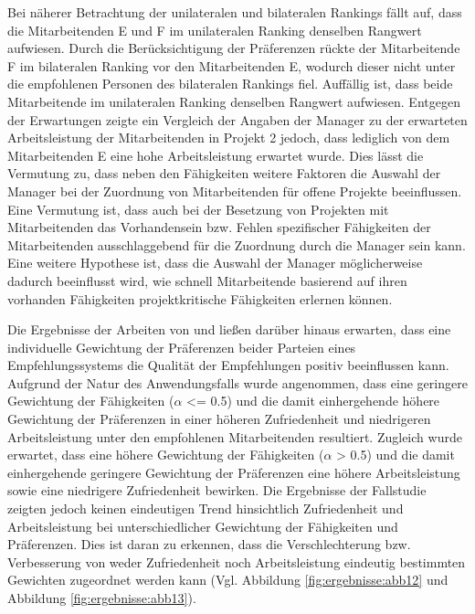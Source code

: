 Bei näherer Betrachtung der unilateralen und bilateralen Rankings fällt auf, dass die Mitarbeitenden E und F im unilateralen Ranking denselben Rangwert aufwiesen.
Durch die Berücksichtigung der Präferenzen rückte der Mitarbeitende F im bilateralen Ranking vor den Mitarbeitenden E, wodurch dieser nicht unter die empfohlenen Personen des bilateralen Rankings fiel.
Auffällig ist, dass beide Mitarbeitende im unilateralen Ranking denselben Rangwert aufwiesen.
Entgegen der Erwartungen zeigte ein Vergleich der Angaben der Manager zu der erwarteten Arbeitsleistung der Mitarbeitenden in Projekt 2 jedoch, dass lediglich von dem Mitarbeitenden E eine hohe Arbeitsleistung erwartet wurde.
Dies lässt die Vermutung zu, dass neben den Fähigkeiten weitere Faktoren die Auswahl der Manager bei der Zuordnung von Mitarbeitenden für offene Projekte beeinflussen.
Eine Vermutung ist, dass auch bei der Besetzung von Projekten mit Mitarbeitenden das Vorhandensein bzw. Fehlen spezifischer Fähigkeiten der Mitarbeitenden ausschlaggebend für die Zuordnung durch die Manager sein kann.  
Eine weitere Hypothese ist, dass die Auswahl der Manager möglicherweise dadurch beeinflusst wird, wie schnell Mitarbeitende basierend auf ihren vorhanden Fähigkeiten projektkritische Fähigkeiten erlernen können.

Die Ergebnisse der Arbeiten von \textcite[S. 131ff.]{kleinerman:2:inproceedings} und \textcite[S. 4031 ff.]{neve:inproceedings} ließen darüber hinaus erwarten, dass eine individuelle Gewichtung der Präferenzen beider Parteien eines Empfehlungssystems die Qualität der Empfehlungen positiv beeinflussen kann.
Aufgrund der Natur des Anwendungsfalls wurde angenommen, dass eine geringere Gewichtung der Fähigkeiten ($\alpha$ <= 0.5) und die damit einhergehende höhere Gewichtung der Präferenzen in einer höheren Zufriedenheit und niedrigeren Arbeitsleistung unter den empfohlenen Mitarbeitenden resultiert.
Zugleich wurde erwartet, dass eine höhere Gewichtung der Fähigkeiten ($\alpha$ > 0.5) und die damit einhergehende geringere Gewichtung der Präferenzen eine höhere Arbeitsleistung sowie eine niedrigere Zufriedenheit bewirken.
Die Ergebnisse der Fallstudie zeigten jedoch keinen eindeutigen Trend hinsichtlich Zufriedenheit und Arbeitsleistung bei unterschiedlicher Gewichtung der Fähigkeiten und Präferenzen.
Dies ist daran zu erkennen, dass die Verschlechterung bzw. Verbesserung von weder Zufriedenheit noch Arbeitsleistung eindeutig bestimmten Gewichten zugeordnet werden kann (Vgl. Abbildung \ref{fig:ergebnisse:abb12} und Abbildung \ref{fig:ergebnisse:abb13}).

